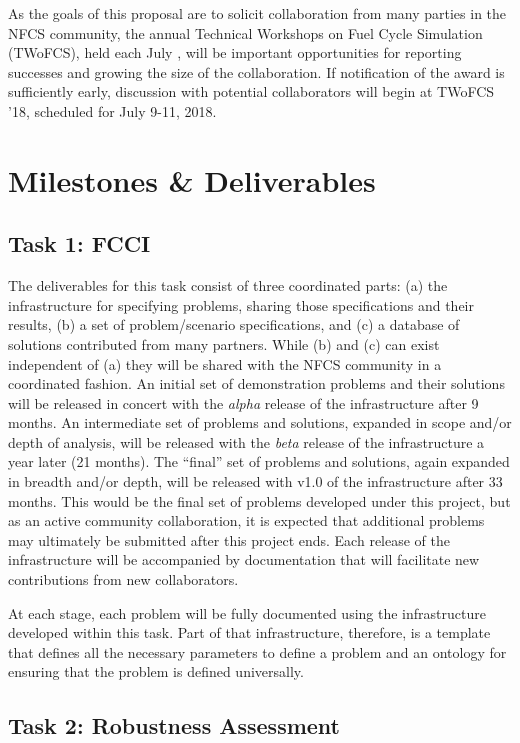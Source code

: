 As the goals of this proposal are to solicit collaboration from many parties
in the \gls{NFCS} community, the annual Technical Workshops on Fuel Cycle
Simulation (TWoFCS), held each July \cite{twofc.2015, twofc.2016}, will be important opportunities for
reporting successes and growing the size of the collaboration.  If
notification of the award is sufficiently early, discussion with potential
collaborators will begin at TWoFCS '18, scheduled for July 9-11, 2018.

\section{Milestones \& Deliverables}

\subsection{Task 1: \gls{FCCI}}

The deliverables for this task consist of three coordinated parts: (a) the
infrastructure for specifying problems, sharing those specifications and their
results, (b) a set of problem/scenario specifications, and (c) a database of
solutions contributed from many partners.  While (b) and (c) can exist
independent of (a) they will be shared with the \gls{NFCS} community in a
coordinated fashion.  An initial set of demonstration problems and their
solutions will be released in concert with the \emph{alpha} release of the
infrastructure after 9 months.  An intermediate set of problems and solutions,
expanded in scope and/or depth of analysis, will be released with the
\emph{beta} release of the infrastructure a year later (21 months).  The
``final'' set of problems and solutions, again expanded in breadth and/or
depth, will be released with v1.0 of the infrastructure after 33 months.  This
would be the final set of problems developed under this project, but as an
active community collaboration, it is expected that additional problems may
ultimately be submitted after this project ends. Each release of the
infrastructure will be accompanied by documentation that will facilitate new
contributions from new collaborators.

At each stage, each problem will be fully documented using the infrastructure
developed within this task.  Part of that infrastructure, therefore, is a
template that defines all the necessary parameters to define a problem and an
ontology for ensuring that the problem is defined universally.

\subsection{Task 2: Robustness Assessment}


